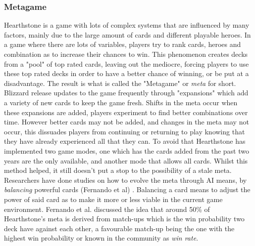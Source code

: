 \documentclass{report}
\begin{document}
	\subsubsection{Metagame}
	Hearthstone is a game with lots of complex systems that are influenced by many factors, mainly due to the large amount of cards and different playable heroes. In a game where there are lots of variables, players try to rank cards, heroes and combination as to increase their chances to win. This phenomenon creates decks from a "pool" of top rated cards, leaving out the mediocre, forcing players to use these top rated decks in order to have a better chance of winning, or be put at a disadvantage. The result is what is called the "Metagame" or {\it{meta}} for short. Blizzard release updates to the game frequently through "expansions" which add a variety of new cards to keep the game fresh. Shifts in the meta occur when these expansions are added, players experiment to find better combinations over time. However better cards may not be added, and changes in the meta may not occur, this dissuades players from continuing or returning to play knowing that they have already experienced all that they can. To avoid that Hearthstone has implemented two game modes, one which has the cards added from the past two years are the only available, and another mode that allows all cards. Whilst this method helped, it still doesn't put a stop to the possibility of a stale meta. Researchers have done studies on how to evolve the meta through AI means, by {\it{balancing}} powerful cards ({Fernando et al}) \cite{EvolveMeta}. Balancing a card means to adjust the power of said card as to make it more or less viable in the current game environment. Fernando et al. discussed the idea that around 50\% of Hearthstone's meta is derived from match-ups which is the win probability two deck have against each other, a favourable match-up being the one with the highest win probability or known in the community as {\it{win rate}}.  
\end{document}
